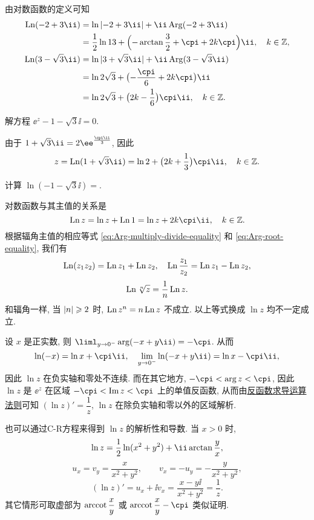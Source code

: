 \begin{solution}
  由对数函数的定义可知
  \begin{align*}
     \Ln(-2+3\ii)&
    =\ln{\abs{-2+3\ii}}+\ii\Arg(-2+3\ii)\\&
    =\frac 12\ln{13}
      +\Bigl(-\arctan\frac 32+\cpi+2k\cpi\Bigr)\ii,
      \quad k\in\BZ,\\
     \Ln(3-\sqrt3\ii)&
    =\ln|3+\sqrt 3\ii|+\ii\Arg(3-\sqrt 3\ii)\\&
    =\ln 2\sqrt 3+\bigl(-\frac\cpi6+2k\cpi\bigr)\ii\\&
    =\ln 2\sqrt 3+\bigl(2k-\frac16\bigr)\cpi\ii,
      \quad k\in\BZ.
  \end{align*}
\end{solution}

\begin{example}
  解方程 $\ee^z-1-\sqrt 3\ii=0$.
\end{example}

\begin{solution}
  由于 $1+\sqrt 3 \ii=2\ee^{\frac{\cpi\ii}3}$, 因此
  \[
     z
    =\Ln(1+\sqrt 3\ii)
    =\ln 2+\bigl(2k+\frac13\bigr)\cpi\ii,
      \quad k\in\BZ.
  \]
\end{solution}

\begin{exercise}
  计算 $\ln(-1-\sqrt3 \ii)=$\fillblank{}.
\end{exercise}

对数函数与其主值的关系是
\[
  \Ln z=\ln z+\Ln 1=\ln z+2k\cpi\ii,\quad k\in\BZ.
\]
根据辐角主值的相应等式 \ref{eq:Arg-multiply-divide-equality} 和 \ref{eq:Arg-root-equality}, 我们有
\[
  \operatorname{Ln}(z_1 z_2)=\operatorname{Ln} z_1+\operatorname{Ln} z_2,\quad
  \operatorname{Ln}\frac{z_1}{z_2}=\operatorname{Ln} z_1-\operatorname{Ln} z_2,
\]
\[
  \operatorname{Ln} \sqrt[n]z=\frac1n\operatorname{Ln} z.
\]
和辐角一样, 当 $\left|n\right|\geqslant 2$ 时, \alert{$\operatorname{Ln} z^n=n\operatorname{Ln} z$ 不成立}.
以上等式换成 $\ln z$ 均不一定成立.

设 $x$ 是正实数, 则 $\liml_{y\ra 0^-}\arg(-x+y\ii)=-\cpi$.
从而
\[
  \ln (-x)=\ln x+\cpi\ii,\quad
  \lim_{y\ra0^-}\ln (-x+y\ii)=\ln x-\cpi\ii,
\]
因此 $\ln z$ 在负实轴和零处不连续.
而在其它地方, $-\cpi<\arg z<\cpi$, 因此 $\ln z$ 是 $\ee^z$ 在区域 $-\cpi<\Im z<\cpi$ 上的单值反函数, 
从而由\hyperref[item:inverse-function-derivative]{反函数求导运算法则}可知 \alert{$(\ln z)'=\dfrac 1z$}, \alert{$\ln z$ 在除负实轴和零以外的区域解析}.

也可以通过C-R方程来得到 $\ln z$ 的解析性和导数.
当 $x>0$ 时,
\[
  \ln z=\half \ln(x^2+y^2)+\ii\arctan \frac yx,
\]
\[
  u_x=v_y=\frac x{x^2+y^2},\qquad v_x=-u_y=-\frac y{x^2+y^2},
\]
\[
  (\ln z)'=u_x+\ii v_x=\frac{x-y\ii}{x^2+y^2}=\frac 1z.
\]
其它情形可取虚部为 $\operatorname{arccot}\dfrac xy$ 或 $\arccot\dfrac xy-\cpi$ 类似证明.



